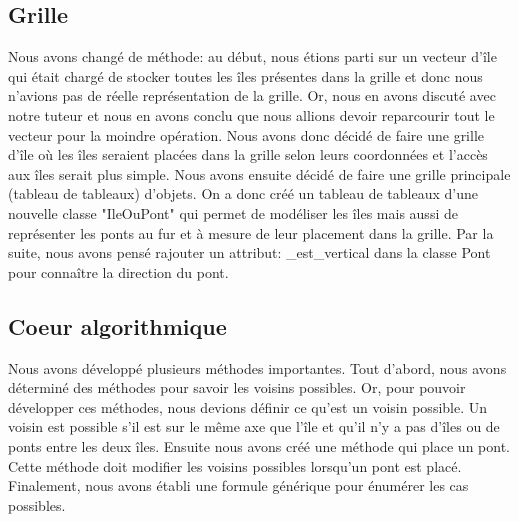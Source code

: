 \documentclass[french]{article}
\begin{document}
    \subsection{\Large Grille}
    \hspace{0.5cm} Nous avons changé de méthode: au début, nous étions parti sur un vecteur d'île qui était chargé de stocker toutes les îles présentes dans la grille et donc nous n'avions pas de réelle représentation de la grille. Or, nous en avons discuté avec notre tuteur et nous en avons conclu que nous allions devoir reparcourir tout le vecteur pour la moindre opération. Nous avons donc décidé de faire une grille d'île où les îles seraient placées dans la grille selon leurs coordonnées et l'accès aux îles serait plus simple. Nous avons ensuite décidé de faire une grille principale (tableau de tableaux) d'objets. On a donc créé un tableau de tableaux d'une nouvelle classe "IleOuPont" qui permet de modéliser les îles mais aussi de représenter les ponts au fur et à mesure de leur placement dans la grille.
    Par la suite, nous avons pensé rajouter un attribut: \_est\_vertical dans la classe Pont pour connaître la direction du pont.
    
    \subsection{\Large Coeur algorithmique}
    \hspace{0.5cm} Nous avons développé plusieurs méthodes importantes. Tout d'abord, nous avons déterminé des méthodes pour savoir les voisins possibles. Or, pour pouvoir développer ces méthodes, nous devions définir ce qu'est un voisin possible.
    Un voisin est possible s'il est sur le même axe que l'île et qu'il n'y a pas d'îles ou de ponts entre les deux îles. Ensuite nous avons créé une méthode qui place un pont. Cette méthode doit modifier les voisins possibles lorsqu'un pont est placé.
    Finalement, nous avons établi une formule générique pour énumérer les cas possibles.
    
\end{document}
